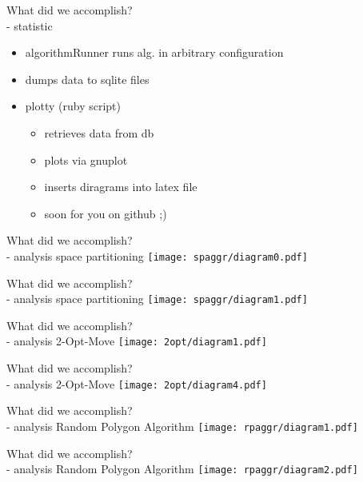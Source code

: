 \documentclass[ucs,9ptb]{beamer}
\begin{document}
\begin{frame}{What did we accomplish?\\- statistic}
  \begin{itemize}
    \item algorithmRunner runs alg. in arbitrary configuration
    \item dumps data to sqlite files
    \item plotty (ruby script)
    \begin{itemize}
      \item retrieves data from db
      \item plots via gnuplot
      \item inserts diragrams into latex file
      \item soon for you on github  ;)
    \end{itemize}
  \end{itemize}
\end{frame}

\begin{frame}{What did we accomplish?\\- analysis}
  space partitioning
  \texttt{[image: spaggr/diagram0.pdf]}
\end{frame}

\begin{frame}{What did we accomplish?\\- analysis}
  space partitioning
  \texttt{[image: spaggr/diagram1.pdf]}
\end{frame}

\begin{frame}{What did we accomplish?\\- analysis}
  2-Opt-Move
  \texttt{[image: 2opt/diagram1.pdf]}
\end{frame}

\begin{frame}{What did we accomplish?\\- analysis}
  2-Opt-Move
  \texttt{[image: 2opt/diagram4.pdf]}
\end{frame}

\begin{frame}{What did we accomplish?\\- analysis}
  Random Polygon Algorithm
  \texttt{[image: rpaggr/diagram1.pdf]}
\end{frame}

\begin{frame}{What did we accomplish?\\- analysis}
  Random Polygon Algorithm
  \texttt{[image: rpaggr/diagram2.pdf]}
\end{frame}
\end{document}
